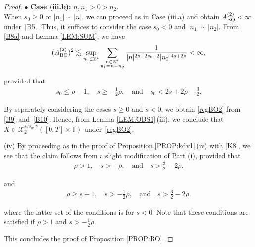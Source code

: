 \documentclass[letterpaper, 11pt,  reqno]{amsart}
\newcommand{\1}{\hspace{0.5mm}\text{I}\hspace{0.5mm}}
\newcommand{\noi}{\noindent}
\newcommand{\Z}{\mathbb{Z}}
\newcommand{\T}{\mathbb{T}}
\newcommand{\bul}{\bullet}
\newcommand{\g}{\gamma}
\newcommand{\les}{\lesssim}
\newcommand{\cX}{\mathcal{X}}
\newcommand{\BO}{\text{\rm BO} }
\numberwithin{equation}{section}
\numberwithin{theorem}{section}
\begin{document}
\begin{proof}
\noi
$\bul$ {\bf Case (iii.b):} $n, n_1>0>n_2$.\\
\indent
When $s_0 \ge 0$ or $|n_1| \sim |n|$, 
we  can proceed as in Case (iii.a) 
and obtain 
$A^{(2)}_\BO < \infty$ under~\eqref{B5}.
Thus, it suffices to consider the case 
$s_0 < 0$ and $ |n_1| \sim |n_2|$.
From \eqref{B8a} and Lemma \ref{LEM:SUM}, we have 
\begin{align*}
(A_\BO^{(2)})^2\les  
\sup_{n_1\in \Z^*}
\sum_{\substack{n\in \Z^*\\ n_1 = n- n_2}}    
 \frac{ 1 }{  |n|^{ 2\rho -2s_0 - 2}  | n_2|^{4s +2\rho} }
< \infty, 
\end{align*}

\noi
provided that 
\begin{align}
s_0 \le \rho - 1, \quad  s  \ge - \frac 12  \rho, \quad
\text{and}\quad 
s_0< 2s + 2\rho -\frac 32.
\label{B10}
\end{align}




By separately considering the cases $s \ge 0$ and $s < 0$, 
we obtain \eqref{regBO2}
from \eqref{B9} and~\eqref{B10}.
Hence,
from  Lemma \ref{LEM:OBS1}\,(iii),  
we conclude that 
 $X\in  \cX^{s,s_0,  \g}_2([0, T]\times \T)$ under~\eqref{regBO2}.







\medskip

\noi
(iv) 
By proceeding as in the proof of Proposition \ref{PROP:kdv1}\,(iv)
with \eqref{K8}, 
we see that the claim follows
from a slight modification of Part (i), 
provided that 
\begin{align*}
\rho >  1, \quad s > - \rho, \quad
\text{and}\quad 
s > \frac 32 - 2 \rho.
\end{align*}



\noi
and 
\begin{align*}
\rho \ge s + 1, \quad s >  -\frac 12  \rho, \quad
\text{and}\quad 
s > \frac 32 - 2 \rho.
\end{align*}

\noi
where the latter set of the conditions is for $s < 0$.
Note that these conditions are  satisfied 
if  $\rho > 1$ and $s > -\frac 12\rho$.

This concludes the proof of Proposition \ref{PROP:BO}.
\end{proof}
\end{document}
